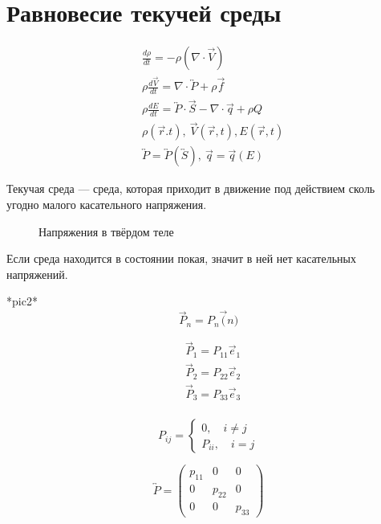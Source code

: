 \section{Равновесие текучей среды}
\begin{align*}
  &\frac{d\rho}{dt} = -\rho(\nabla \cdot \vec{V}) \\
  &\rho \frac{d \vec{V}}{dt} = \nabla \cdot \overleftrightarrow{P} + \rho \vec{f} \\
  & \rho \frac{d E}{dt} = \overleftrightarrow{P} \cdot \vec{S} - \nabla \cdot \vec{q} + \rho Q \\
  &\rho(\vec{r}. t),\ \vec{V}(\vec{r}, t), E(\vec{r}, t) \\
  &\overleftrightarrow{P} = \overleftrightarrow{P} (\overleftrightarrow{S}),\ \vec{q} = \vec{q}(E)
\end{align*}

\begin{defn}
  Текучая среда --- среда, которая приходит в движение под действием сколь
  угодно малого касательного напряжения.
\end{defn}

\begin{figure}[h]
    \centering
    
    \caption{Напряжения в твёрдом теле}
\end{figure}

\begin{note}
  Если среда находится в состоянии покая, значит в ней нет касательных напряжений.
\end{note}

*pic2*
\[
  \vec{P}_n = P_n \vec(n)
\]

\begin{align*}
  &\vec{P}_1 = P_{11} \vec{e}_1 \\
  &\vec{P}_2 = P_{22} \vec{e}_2 \\
  &\vec{P}_3 = P_{33} \vec{e}_3 \\
\end{align*}

\[
  P_{ij} = \begin{cases}
    0, \quad i \neq j \\
    P_{ii}, \quad i = j
  \end{cases}
\]

\[
  \overleftrightarrow{P} =
  \begin{pmatrix}
    p_{11} &0 &0 \\
    0 &p_{22} &0 \\
    0 &0 &p_{33}
  \end{pmatrix}
\]

